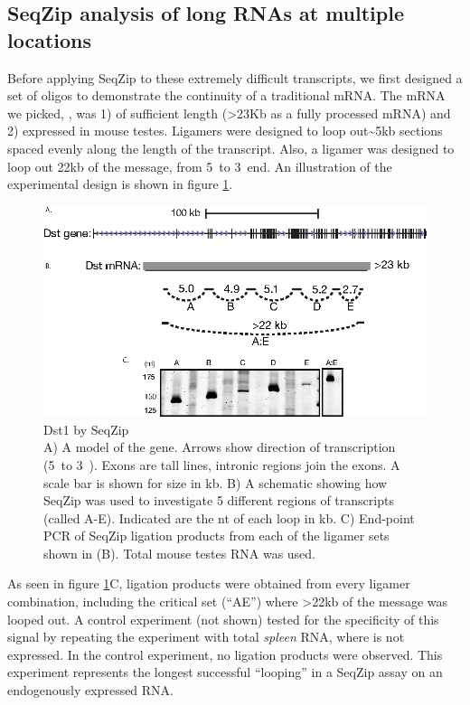  \subsection{SeqZip analysis of long RNAs at multiple locations}
    \label{SeqZipMethod:subsec:SeqZip on long RNAs at multiple locations}

    Before applying SeqZip to these extremely difficult transcripts, we first designed a set of oligos to demonstrate the continuity of a traditional mRNA. The mRNA we picked, \dst{}, was 1) of sufficient length (>23Kb as a fully processed mRNA) and 2) expressed in mouse testes. Ligamers were designed to loop out\textasciitilde5kb sections spaced evenly along the length of the transcript. Also, a ligamer was designed to loop out 22kb of the message, from 5\textprime~to 3\textprime~end. An illustration of the experimental design is shown in figure \ref{SeqZipMethod:fig:SeqZip on dst1}.

    \begin{figure} %
      \centering 
      \includegraphics{Figures/SeqZipMethod/dst1.eps}
      \caption[Dst1 by SeqZip]
      {
        Dst1 by SeqZip\\[0.25cm]
        A) A model of the \dst{} gene. Arrows show direction of transcription (5\textprime~to 3\textprime~). Exons are tall lines, intronic regions join the exons. A scale bar is shown for size in kb. B) A schematic showing how SeqZip was used to investigate 5 different regions of \dst{} transcripts (called A-E). Indicated are the nt of each loop in kb. C) End-point PCR of SeqZip ligation products from each of the ligamer sets shown in (B). Total mouse testes RNA was used.
        }
      \label{SeqZipMethod:fig:SeqZip on dst1}
      \end{figure}

    As seen in figure \ref{SeqZipMethod:fig:SeqZip on dst1}C, ligation products were obtained from every ligamer combination, including the critical set (``AE'') where >22kb of the message was looped out. A control experiment (not shown) tested for the specificity of this signal by repeating the experiment with total \textit{spleen} RNA, where \dst{} is not expressed. In the control experiment, no ligation products were observed. This experiment represents the longest successful ``looping'' in a SeqZip assay on an endogenously expressed RNA. 

